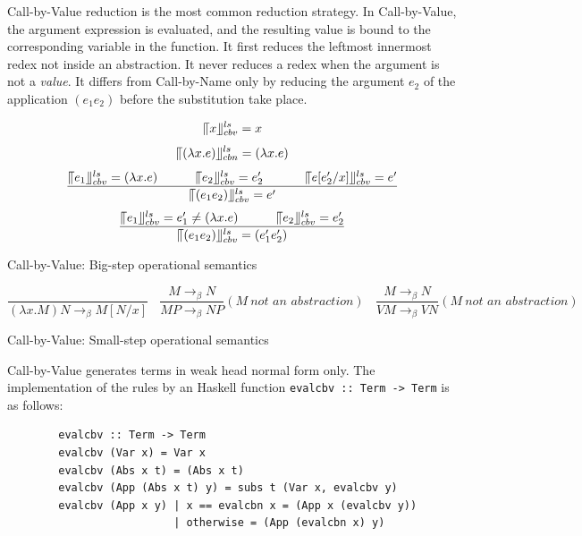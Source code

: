 \documentclass[a4paper,11pt,twoside]{report}
\begin{document}
Call-by-Value reduction is the most common reduction strategy. In Call-by-Value, the argument expression is evaluated, and the resulting value is bound to the corresponding variable in the function. It first reduces the leftmost innermost redex not inside an abstraction. It never reduces a redex when the argument is not a \textit{value}. It differs from Call-by-Name only by reducing the argument $e_2$ of the application $(e_1e_2)$ before the substitution take place. 


\begin{equation*}
\llceil x \rrfloor ^{ls} _{cbv} = x
\end{equation*}
\begin{equation*}
\llceil (\lambda x.e) \rrfloor ^{ls} _{cbn} = (\lambda x.e)
\end{equation*}
\begin{equation*}
\frac{\llceil e_1 \rrfloor ^{ls} _{cbv} = (\lambda x.e)\ \ \ \ \ \ \ \ \ \llceil e_2 \rrfloor ^{ls} _{cbv} = e'_2\ \ \ \ \ \ \ \ \ \ \llceil e[e'_2/x] \rrfloor ^{ls} _{cbv}  = e'}{\llceil (e_1e_2) \rrfloor ^{ls} _{cbv} = e'}
\end{equation*}
\begin{equation*}
\frac{\llceil e_1 \rrfloor ^{ls} _{cbv} = e'_1\neq (\lambda x.e)\ \ \ \ \ \ \ \ \ \llceil e_2 \rrfloor ^{ls} _{cbv} = e'_2}{\llceil (e_1e_2) \rrfloor ^{ls} _{cbv} = (e'_1e'_2)}
\end{equation*}
\begin{center}
Call-by-Value: Big-step operational semantics
\end{center}

\begin{equation*}
\frac{}{(\lambda x.M)N \rightarrow _\beta M[N/x]}\ \ \ \  
\frac{M \rightarrow _\beta N}{MP \rightarrow _\beta NP}(M\ \textit{not an abstraction})\ \ \ \
\frac{M \rightarrow _\beta N}{VM \rightarrow _\beta VN}(M\ \textit{not an abstraction})\ \ \ 
\end{equation*}
\begin{center}
Call-by-Value: Small-step operational semantics
\end{center}

Call-by-Value generates terms in weak head normal form only. The implementation of the rules by an Haskell function \verb|evalcbv :: Term -> Term| is as follows:

\begin{verbatim}
        evalcbv :: Term -> Term
        evalcbv (Var x) = Var x
        evalcbv (Abs x t) = (Abs x t)
        evalcbv (App (Abs x t) y) = subs t (Var x, evalcbv y)
        evalcbv (App x y) | x == evalcbn x = (App x (evalcbv y))
                          | otherwise = (App (evalcbn x) y)  
\end{verbatim}
\end{document}
